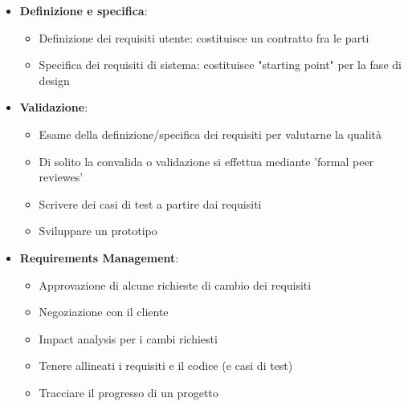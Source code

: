 \documentclass[12pt, a4paper]{report}
\begin{document}
\begin{itemize}
\begin{itemize}
    \end{itemize}
    \item \textbf{Definizione e specifica}: \begin{itemize}
        \item Definizione dei requisiti utente: costituisce un contratto fra le parti
        \item Specifica dei requisiti di sistema: costituisce "starting point" per la fase di design
    \end{itemize}
    \item \textbf{Validazione}: \begin{itemize}
        \item Esame della definizione/specifica dei requisiti per valutarne la qualità
        \item Di solito la convalida o validazione si effettua mediante 'formal peer reviewes'
        \item Scrivere dei casi di test a partire dai requisiti
        \item Sviluppare un prototipo
    \end{itemize}
    \item \textbf{Requirements Management}: \begin{itemize}
        \item Approvazione di alcune richieste di cambio dei requisiti
        \item Negoziazione con il cliente
        \item Impact analysis per i cambi richiesti
        \item Tenere allineati i requisiti e il codice (e casi di test)
        \item Tracciare il progresso di un progetto
    \end{itemize}
\end{itemize}
\end{document}
